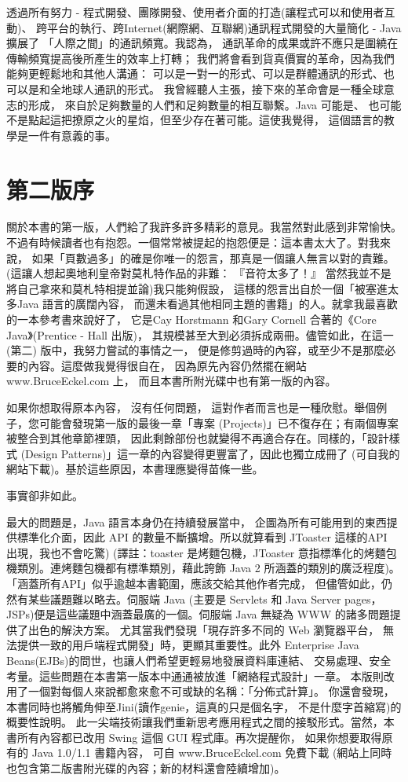 透過所有努力 - 程式開發、團隊開發、使用者介面的打造(讓程式可以和使用者互動)、
跨平台的執行、跨Internet(網際網、互聯網)通訊程式開發的大量簡化 - Java 擴展了
「人際之間」的通訊頻寬。我認為，
通訊革命的成果或許不應只是圍繞在傳輸頻寬提高後所產生的效率上打轉；
我們將會看到貨真價實的革命，因為我們能夠更輕鬆地和其他人溝通：
可以是一對一的形式、可以是群體通訊的形式、也可以是和全地球人通訊的形式。
我曾經聽人主張，接下來的革命會是一種全球意志的形成，
來自於足夠數量的人們和足夠數量的相互聯繫。Java 可能是、
也可能不是點起這把撩原之火的星焰，但至少存在著可能。這使我覺得，
這個語言的教學是一件有意義的事。


\section{第二版序}

關於本書的第一版，人們給了我許多許多精彩的意見。我當然對此感到非常愉快。
不過有時候讀者也有抱怨。一個常常被提起的抱怨便是：這本書太大了。對我來說，
如果「頁數過多」的確是你唯一的怨言，那真是一個讓人無言以對的責難。
(這讓人想起奧地利皇帝對莫札特作品的非難： 『音符太多了！』
當然我並不是將自己拿來和莫札特相提並論)我只能夠假設，
這樣的怨言出自於一個「被塞進太多Java 語言的廣闊內容，
而還未看過其他相同主題的書籍」的人。就拿我最喜歡的一本參考書來說好了，
它是Cay Horstmann 和Gary Cornell 合著的《Core Java》(Prentice - Hall 出版)，
其規模甚至大到必須拆成兩冊。儘管如此，在這一 (第二) 版中，我努力嘗試的事情之一，
便是修剪過時的內容，或至少不是那麼必要的內容。這麼做我覺得很自在，
因為原先內容仍然擺在網站 www.BruceEckel.com 上，
而且本書所附光碟中也有第一版的內容。

如果你想取得原本內容， 沒有任何問題，
這對作者而言也是一種欣慰。舉個例子，您可能會發現第一版的最後一章「專案
(Projects)」已不復存在；有兩個專案被整合到其他章節裡頭，
因此剩餘部份也就變得不再適合存在。同樣的，「設計樣式
(Design Patterns)」這一章的內容變得更豐富了，因此也獨立成冊了
(可自我的網站下載)。基於這些原因，本書理應變得苗條一些。

事實卻非如此。

最大的問題是，Java 語言本身仍在持續發展當中，
企圖為所有可能用到的東西提供標準化介面，因此 API 的數量不斷擴增。所以就算看到
JToaster 這樣的API 出現，我也不會吃驚) (譯註：toaster 是烤麵包機，JToaster
意指標準化的烤麵包機類別。連烤麵包機都有標準類別，藉此誇飾 Java 2
所涵蓋的類別的廣泛程度)。「涵蓋所有API」似乎逾越本書範圍，應該交給其他作者完成，
但儘管如此，仍然有某些議題難以略去。伺服端 Java (主要是 Servlets 和
Java Server pages，JSPs)便是這些議題中涵蓋最廣的一個。伺服端 Java 無疑為
WWW 的諸多問題提供了出色的解決方案。
尤其當我們發現「現存許多不同的 Web 瀏覽器平台，
無法提供一致的用戶端程式開發」時，更顯其重要性。此外
Enterprise Java Beans(EJBs)的問世，也讓人們希望更輕易地發展資料庫連結、
交易處理、安全考量。這些問題在本書第一版本中通通被放進「網絡程式設計」一章。
本版則改用了一個對每個人來說都愈來愈不可或缺的名稱：「分佈式計算」。
你還會發現，本書同時也將觸角伸至Jini(讀作genie，這真的只是個名字，
不是什麼字首縮寫)的概要性說明。
此一尖端技術讓我們重新思考應用程式之間的接駁形式。當然，本書所有內容都已改用
Swing 這個 GUI 程式庫。再次提醒你， 如果你想要取得原有的 Java 1.0/1.1 書籍內容，
可自 www.BruceEckel.com 免費下載
(網站上同時也包含第二版書附光碟的內容；新的材料還會陸續增加)。


